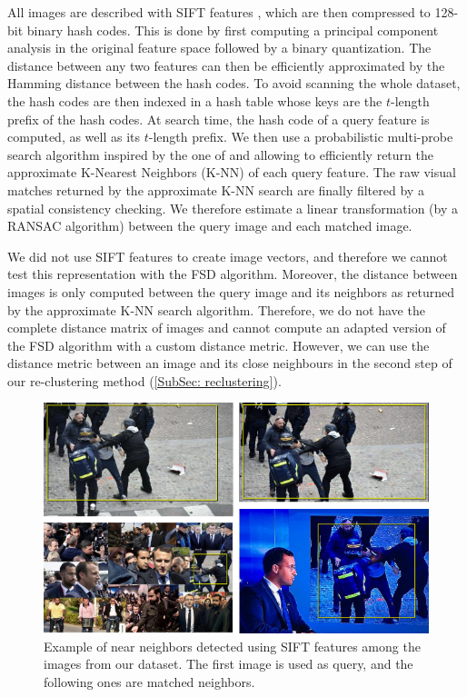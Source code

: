\begin{enumerate}
    All images are described with SIFT features \cite{lowe1999object}, which are then compressed to 128-bit binary hash codes. This is done by first computing a principal component analysis in the original feature space followed by a binary quantization. The distance between any two features can then be efficiently approximated by the Hamming distance between the hash codes. To avoid scanning the whole dataset, the hash codes are then indexed in a hash table whose keys are the $t$-length prefix of the hash codes. At search time, the hash code  of a query feature is computed, as well as its $t$-length prefix. We then use a probabilistic multi-probe search algorithm inspired by the one of \cite{joly2008posteriori} and allowing to efficiently return the approximate K-Nearest Neighbors (K-NN) of each query feature. The raw visual matches returned by the approximate K-NN search are finally filtered by a spatial consistency checking. We therefore estimate a linear transformation (by a RANSAC algorithm) between the query image and each matched image.
    
    We did not use SIFT features to create image vectors, and therefore we cannot test this representation with the FSD algorithm. Moreover, the distance between images is only computed between the query image and its neighbors as returned by the approximate K-NN search algorithm. Therefore, we do not have the complete distance matrix of images and cannot compute an adapted version of the FSD algorithm with a custom distance metric. However, we can use the distance metric between an image and its close neighbours in the second step of our re-clustering method (\ref{SubSec: reclustering}).
    
\begin{figure}[h]
  \centering
  \includegraphics[width=\linewidth]{./figures/Benalla.png}
  \caption{Example of near neighbors detected using SIFT features among the images from our dataset. The first image is used as query, and the following ones are matched neighbors.}
  \label{Fig:Benalla}
\end{figure}

\end{enumerate}

